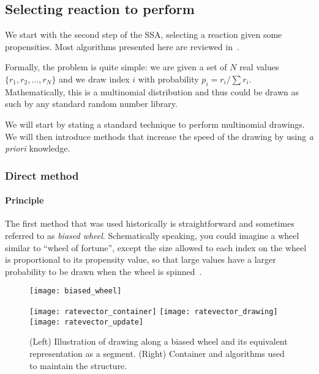 \subsection{Selecting reaction to perform}
\label{sec:reaction_selection}

We start with the second step of the SSA, selecting a reaction given some propensities.
Most algorithms presented here are reviewed in~\citet{gillespie_perspective:_2013}.

Formally, the problem is quite simple:
we are given a set of $N$ real values $\{ r_1, r_2, \ldots{}, r_N \}$
and we draw index $i$ with probability $p_i = r_i / \sum r_i$.
Mathematically, this is a multinomial distribution and thus could be drawn as such by any standard random number library.

We will start by stating a standard technique to perform multinomial drawings.
We will then introduce methods that increase the speed of the drawing by using \textit {a priori} knowledge.

\subsubsection{Direct method}

\paragraph{Principle}
The first method that was used historically is straightforward
and sometimes referred to as \textit{biased wheel}.
Schematically speaking, you could imagine a wheel similar to ``wheel of fortune'',
except the size allowed to each index on the wheel is proportional to its propensity value,
so that large values have a larger probability to be drawn when the wheel is spinned~.

\begin{figure}[!h]
  \centering
  \begin{minipage}{\textwidth}
    \begin{minipage}{0.5\textwidth}
      \texttt{[image: biased\_wheel]}
    \end{minipage}
    \begin{minipage}{0.5\textwidth}
      \texttt{[image: ratevector\_container]}
      \texttt{[image: ratevector\_drawing]}
      \texttt{[image: ratevector\_update]}
    \end{minipage}
  \end{minipage}
  \caption{(Left) Illustration of drawing along a biased wheel and its equivalent representation as a segment.
  (Right) Container and algorithms used to maintain the structure.}
\label{fig:biased_wheel}
\end{figure}

